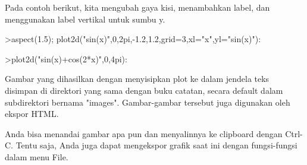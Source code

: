 \documentclass[12pt,arial,letterpaper]{book}
\begin{document}
\begin{eulercomment}
\begin{eulercomment}
\begin{eulercomment}
\begin{eulercomment}
\begin{eulercomment}
\begin{eulercomment}
\begin{eulercomment}
\begin{eulercomment}
\begin{eulercomment}
\begin{eulercomment}
\begin{eulercomment}
\begin{eulercomment}
\begin{eulercomment}
\begin{eulercomment}
\begin{eulercomment}
\begin{eulercomment}
\begin{eulercomment}
Pada contoh berikut, kita mengubah gaya kisi, menambahkan label, dan
menggunakan label vertikal untuk sumbu y.
\end{eulercomment}
\begin{eulerprompt}
>aspect(1.5); plot2d("sin(x)",0,2pi,-1.2,1.2,grid=3,xl="x",yl="sin(x)"):
\end{eulerprompt}
\begin{eulerprompt}
>plot2d("sin(x)+cos(2*x)",0,4pi):
\end{eulerprompt}
\begin{eulercomment}
Gambar yang dihasilkan dengan menyisipkan plot ke dalam jendela teks
disimpan di direktori yang sama dengan buku catatan, secara default
dalam subdirektori bernama "images". Gambar-gambar tersebut juga
digunakan oleh ekspor HTML.

Anda bisa menandai gambar apa pun dan menyalinnya ke clipboard dengan
Ctrl-C. Tentu saja, Anda juga dapat mengekspor grafik saat ini dengan
fungsi-fungsi dalam menu File.


\end{eulercomment}
\end{eulercomment}
\end{eulercomment}
\end{eulercomment}
\end{eulercomment}
\end{eulercomment}
\end{eulercomment}
\end{eulercomment}
\end{eulercomment}
\end{eulercomment}
\end{eulercomment}
\end{eulercomment}
\end{eulercomment}
\end{eulercomment}
\end{eulercomment}
\end{eulercomment}
\end{eulercomment}
\end{document}
